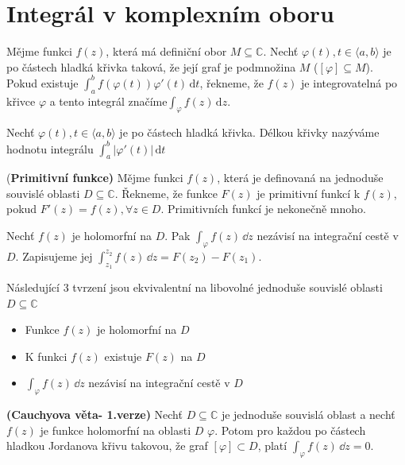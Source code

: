 \section{Integrál v komplexním oboru}
\begin{definition}
	Mějme funkci $f(z)$, která má definiční obor $M \subseteq \mathbb{C}$. Nechť $\varphi(t), t \in \langle a,b \rangle$ je po částech hladká křivka taková, že její graf je podmnožina $M$ ($[\varphi] \subseteq M$). Pokud existuje $\int_a^b f(\varphi(t))\varphi'(t)\, \mathrm{d} t$, řekneme, že $f(z)$ je integrovatelná po křivce $\varphi$ a tento integrál značíme$\int_{\varphi} f(z)\, \mathrm{d} z$.
\end{definition}

\begin{definition}
	Nechť $\varphi(t), t \in \langle a,b \rangle$ je po částech hladká křivka. Délkou křivky nazýváme hodnotu integrálu $\int_a^b |\varphi'(t)|\, \mathrm{d} t$
 \end{definition}

\begin{definition}
(\textbf{Primitivní funkce)} Mějme funkci $f(z)$, která je definovaná na jednoduše souvislé oblasti $D \subseteq \mathbb{C}$. Řekneme, že funkce $F(z)$ je primitivní funkcí k $f(z)$, pokud $F'(z)=f(z), \forall z \in D$. Primitivních funkcí je nekonečně mnoho.
\end{definition}

\begin{theorem}
	Nechť \fce  $f(z)$ je holomorfní na $D$. Pak $\int_{\varphi}f(z) \, \dd z $ nezávisí na integrační cestě v $D$. Zapisujeme jej $\int_{z_1}^{z_2}f(z) \, \dd z = F(z_2)-F(z_1)$.
\end{theorem}

\begin{theorem}
	Následující 3 tvrzení jsou ekvivalentní na libovolné jednoduše souvislé oblasti $D \subseteq \mathbb{C}$
	\begin{itemize}
		\item Funkce $f(z)$ je holomorfní na $D$
		\item K funkci $f(z)$ existuje $F(z)$ na $D$
		\item $\int_{\varphi} f(z)\,  \dd z$ nezávisí na integrační cestě v $D$ 
	\end{itemize}
\end{theorem}

\begin{theorem}
\textbf{(Cauchyova věta- 1.verze)} Nechť $D \subseteq \mathbb{C} $ je jednoduše souvislá oblast a nechť $f(z)$ je funkce holomorfní na oblasti $D$ $\varphi$. Potom pro každou po částech hladkou Jordanova křivu takovou, že graf $[\varphi]\subset D $,  platí $\int_{\varphi} f(z)\, \dd z = 0.$
\end{theorem}



